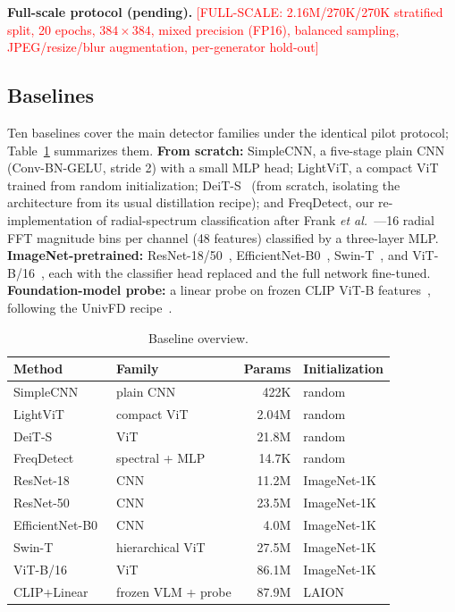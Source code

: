 \documentclass[journal]{IEEEtran}
\newcommand{\fullscale}[1]{\textcolor{red}{[FULL-SCALE: #1]}}
\begin{document}
\textbf{Full-scale protocol (pending).} \fullscale{2.16M/270K/270K stratified split, 20 epochs, $384\times384$, mixed precision (FP16), balanced sampling, JPEG/resize/blur augmentation, per-generator hold-out}

\subsection{Baselines}
\label{sec:baselines}
Ten baselines cover the main detector families under the identical pilot protocol; Table~\ref{tab:baseline_overview} summarizes them. \textbf{From scratch:} SimpleCNN, a five-stage plain CNN (Conv-BN-GELU, stride 2) with a small MLP head; LightViT, a compact ViT trained from random initialization; DeiT-S~\cite{touvron2021} (from scratch, isolating the architecture from its usual distillation recipe); and FreqDetect, our re-implementation of radial-spectrum classification after Frank \textit{et al.}~\cite{frank2020}---16 radial FFT magnitude bins per channel (48 features) classified by a three-layer MLP. \textbf{ImageNet-pretrained:} ResNet-18/50~\cite{he2016}, EfficientNet-B0~\cite{tan2019}, Swin-T~\cite{liu2021}, and ViT-B/16~\cite{dosovitskiy2021}, each with the classifier head replaced and the full network fine-tuned. \textbf{Foundation-model probe:} a linear probe on frozen CLIP ViT-B features~\cite{radford2021}, following the UnivFD recipe~\cite{ojha2023}.

\begin{table}[!t]
\renewcommand{\arraystretch}{1.2}
\caption{Baseline overview.}
\label{tab:baseline_overview}
\centering
\setlength{\tabcolsep}{4pt}
\begin{tabular}{llrl}
\toprule
Method & Family & Params & Initialization \\
\midrule
SimpleCNN   & plain CNN        & 422K   & random \\
LightViT    & compact ViT      & 2.04M  & random \\
DeiT-S~\cite{touvron2021} & ViT & 21.8M & random \\
FreqDetect~\cite{frank2020} & spectral + MLP & 14.7K & random \\
ResNet-18~\cite{he2016}   & CNN & 11.2M & ImageNet-1K \\
ResNet-50~\cite{he2016}   & CNN & 23.5M & ImageNet-1K \\
EfficientNet-B0~\cite{tan2019} & CNN & 4.0M & ImageNet-1K \\
Swin-T~\cite{liu2021}     & hierarchical ViT & 27.5M & ImageNet-1K \\
ViT-B/16~\cite{dosovitskiy2021} & ViT & 86.1M & ImageNet-1K \\
CLIP+Linear~\cite{radford2021,ojha2023} & frozen VLM + probe & 87.9M & LAION \\
\bottomrule
\end{tabular}
\end{table}
\end{document}
